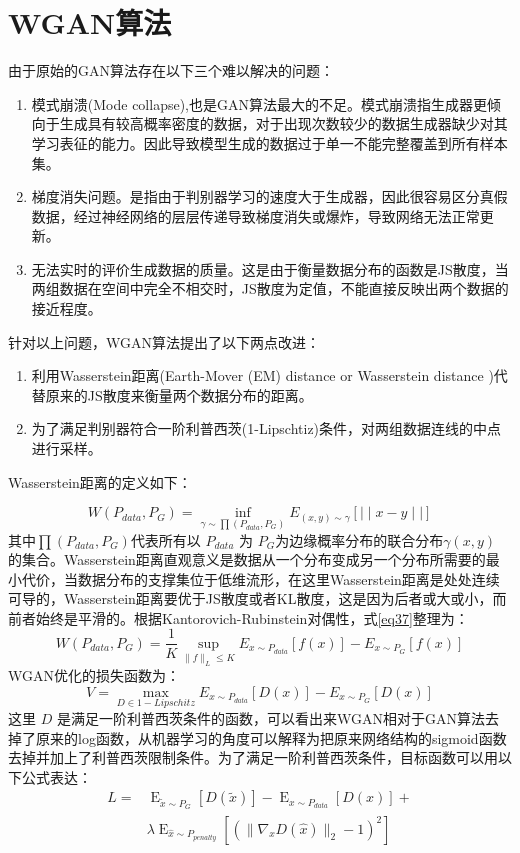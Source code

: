 \section{WGAN算法}
由于原始的GAN算法存在以下三个难以解决的问题\cite{12}：
\begin{enumerate}
	\item 模式崩溃(Mode collapse),也是GAN算法最大的不足。模式崩溃指生成器更倾向于生成具有较高概率密度的数据，对于出现次数较少的数据生成器缺少对其学习表征的能力。因此导致模型生成的数据过于单一不能完整覆盖到所有样本集。
	\item 梯度消失问题。是指由于判别器学习的速度大于生成器，因此很容易区分真假数据，经过神经网络的层层传递导致梯度消失或爆炸，导致网络无法正常更新。
	\item 无法实时的评价生成数据的质量。这是由于衡量数据分布的函数是JS散度，当两组数据在空间中完全不相交时，JS散度为定值，不能直接反映出两个数据的接近程度。
\end{enumerate}
针对以上问题，WGAN\cite{arjovsky2017wasserstein}算法提出了以下两点改进：
\begin{enumerate}
\item  利用Wasserstein距离(Earth-Mover (EM) distance or Wasserstein distance )代替原来的JS散度来衡量两个数据分布的距离。
\item 为了满足判别器符合一阶利普西茨(1-Lipschtiz)条件，对两组数据连线的中点进行采样。
\end{enumerate}

Wasserstein距离的定义如下：

\begin{equation}
\label{eq37}
W(P_{data},P_{G})= \inf \limits_{\gamma \sim \prod (P_{data},P_{G})} E_{(x,y)\sim\gamma}[\mid\mid x-y\mid\mid]
\end{equation}
其中${ \prod (P_{data},P_{G})}$代表所有以 $P_{data}$ 为 $P_{G}$为边缘概率分布的联合分布$\gamma(x,y)$ 的集合。Wasserstein距离直观意义是数据从一个分布变成另一个分布所需要的最小代价，当数据分布的支撑集位于低维流形，在这里Wasserstein距离是处处连续可导的，Wasserstein距离要优于JS散度或者KL散度，这是因为后者或大或小，而前者始终是平滑的。根据Kantorovich-Rubinstein对偶性，式\ref{eq37}整理为：
\begin{equation}
\label{eq38}
W(P_{data},P_{G})= \frac{1}{K} \sup \limits_{\| f \| _{L} \leq K} E_{x\sim P_{data}}[f(x)]-E_{x\sim P_{G}}[f(x)]
\end{equation}
WGAN优化的损失函数为：
\begin{equation}
\label{eq39}
V= \max \limits_{D\in 1- Lipschitz} E_{x\sim P_{data}}[D(x)]-E_{x\sim P_{G}}[D(x)]
\end{equation}
这里 $D$ 是满足一阶利普西茨条件的函数，可以看出来WGAN相对于GAN算法去掉了原来的log函数，从机器学习的角度可以解释为把原来网络结构的sigmoid函数去掉并加上了利普西茨限制条件。为了满足一阶利普西茨条件，目标函数可以用以下公式表达：
\begin{equation}
\label{eq10}
\begin{aligned}
L=&\mathop{E}_{\tilde{x} \sim P_{G}}[D( \tilde{x})]- \mathop{E}_{x \sim P_{data}}[D(x)]+ \\&\lambda \mathop{E}_{\hat{x}\sim P_{ {penalty}}} [(\| \nabla _{  \hat{x}} D(\hat{x}) \|_{2} - 1)^{2}]
\end{aligned}
\end{equation}

